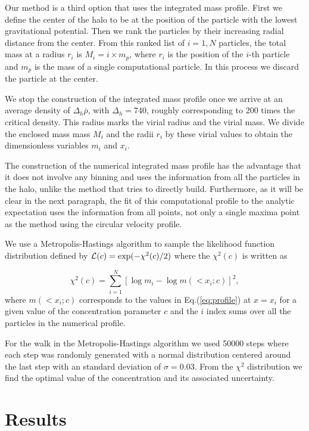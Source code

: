 \documentclass[useAMS,usenatbib]{mn2e}
\begin{document}
Our method is a third option that uses the integrated mass profile.
First we define the center of the halo to be at the position of the
particle with the lowest gravitational potential.
Then we rank the particles by their increasing radial distance from
the center.
From this ranked list of $i=1,N$ particles, the total mass at a radius
$r_i$ is $M_i=i\times m_p$, where $r_i$ is
the position of the $i$-th particle and $m_p$ is the mass of a single
computational particle.
In this process we discard the particle at the center.

We stop the construction of the integrated mass profile once we arrive
at an average density of $\Delta_h\bar{\rho}$, with $\Delta_h=740$,
roughly corresponding to 200 times the critical density.
This radius marks the virial radius and the virial mass.
We divide the enclosed mass mass $M_i$ and the radii $r_i$ by these
virial values to obtain the dimensionless variables $m_i$ and $x_i$.

The construction of the numerical integrated mass profile has the
advantage that it does not involve any binning and uses the
information from all the particles in the halo, unlike the method that
tries to directly build.
Furthermore, as it will be clear in the next paragraph, the fit of
this computational profile to the analytic expectation uses the
information from all points, not only a single maxima point as the
method using the circular velocity profile.

We use a Metropolis-Hastings algorithm to sample the likelihood
function distribution defined by ${\cal L}(c)=\exp(-\chi^2(c)/2)$
where the $\chi^2(c)$ is written as

\begin{equation}
\chi^2(c)= \sum_{i=1}^{N}[\log m_i - \log m(< x_i;c)]^2,
\end{equation}
%
where $m(<x_i;c)$ corresponds to the values in Eq.(\ref{eq:profile}) at
$x=x_i$ for a given value of the concentration parameter $c$ and the
$i$ index sums over all the particles in the numerical profile.

For the walk in the Metropolis-Hastings algorithm we used 50000 steps
where each step was randomly generated with a normal distribution
centered around the last step with an standard deviation of
$\sigma=0.03$.
From the $\chi^2$ distribution we find the optimal value of the
concentration and  its associated uncertainty.

\section{Results}
\label{sec:results}
\end{document}

